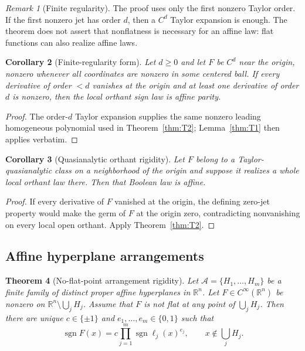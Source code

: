 \documentclass[11pt]{article}
\newtheorem{theorem}{Theorem}[section]
\newtheorem{corollary}[theorem]{Corollary}
\theoremstyle{definition}
\theoremstyle{remark}
\newtheorem{remark}[theorem]{Remark}
\newcommand{\R}{\mathbb{R}}
\newcommand{\bits}{\{0,1\}}
\newcommand{\sign}{\operatorname{sgn}}
\newcommand{\cA}{\mathcal{A}}
\begin{document}
\begin{remark}[Finite regularity]
The proof uses only the first nonzero Taylor order. If the first nonzero jet has order $d$, then a $C^d$ Taylor expansion is enough. The theorem does not assert that nonflatness is necessary for an affine law: flat functions can also realize affine laws.
\end{remark}

\begin{corollary}[Finite-regularity form]\label{cor:finiteC}
Let $d\ge 0$ and let $F$ be $C^d$ near the origin, nonzero whenever all coordinates are nonzero in some centered ball. If every derivative of order $<d$ vanishes at the origin and at least one derivative of order $d$ is nonzero, then the local orthant sign law is affine parity.
\end{corollary}

\begin{proof}
The order-$d$ Taylor expansion supplies the same nonzero leading homogeneous polynomial used in Theorem~\ref{thm:T2}; Lemma~\ref{thm:T1} then applies verbatim.
\end{proof}

\begin{corollary}[Quasianalytic orthant rigidity]\label{cor:quasiorth}
Let $F$ belong to a Taylor-quasianalytic class on a neighborhood of the origin and suppose it realizes a whole local orthant law there. Then that Boolean law is affine.
\end{corollary}

\begin{proof}
If every derivative of $F$ vanished at the origin, the defining zero-jet property would make the germ of $F$ at the origin zero, contradicting nonvanishing on every local open orthant. Apply Theorem~\ref{thm:T2}.
\end{proof}

\subsection{Affine hyperplane arrangements}

\begin{theorem}[No-flat-point arrangement rigidity]\label{thm:T3}
Let $\cA=\{H_1,\dots,H_m\}$ be a finite family of distinct proper affine hyperplanes in $\R^n$. Let $F\in C^\infty(\R^n)$ be nonzero on $\R^n\setminus\bigcup_jH_j$. Assume that $F$ is not flat at any point of $\bigcup_jH_j$. Then there are unique $c\in\{\pm1\}$ and $e_1,\dots,e_m\in\bits$ such that
\begin{equation}\label{eq:arrparity}
 \sign F(x)
 =c\prod_{j=1}^m\sign\ell_j(x)^{e_j},
 \qquad x\notin\bigcup_jH_j.
\end{equation}
\end{theorem}
\end{document}
